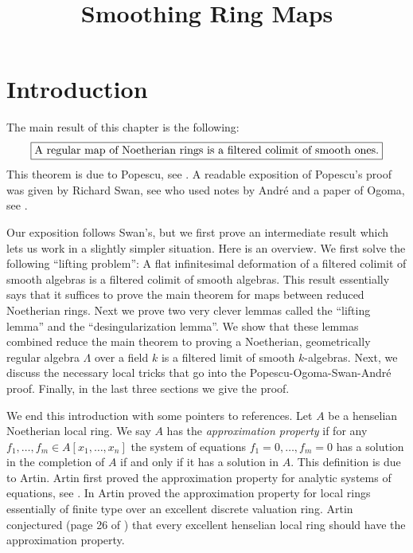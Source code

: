 

%


\title{Smoothing Ring Maps}


\maketitle

\label{section-phantom}

\tableofcontents

\section{Introduction}
\label{section-introduction}

\noindent
The main result of this chapter is the following:
$$
\fbox{A regular map of Noetherian rings is a filtered colimit
of smooth ones.}
$$
This theorem is due to Popescu, see \cite{popescu-letter}.
A readable exposition of Popescu's proof was given by Richard Swan,
see \cite{swan} who used notes by Andr\'e and a paper of Ogoma, see
\cite{Ogoma}.

\medskip\noindent
Our exposition follows Swan's, but we first prove an intermediate result
which lets us work in a slightly simpler situation. Here is an overview.
We first solve the following ``lifting problem'': A flat infinitesimal
deformation of a filtered colimit of smooth algebras is a filtered colimit
of smooth algebras. This result essentially says that it suffices to prove
the main theorem for maps between reduced Noetherian rings. Next we prove
two very clever lemmas called the ``lifting lemma'' and the
``desingularization lemma''. We show that these lemmas combined
reduce the main theorem to proving a Noetherian, geometrically regular
algebra $\Lambda$ over a field $k$ is a filtered limit of smooth $k$-algebras.
Next, we discuss the necessary local tricks that go into the
Popescu-Ogoma-Swan-Andr\'e proof. Finally, in the last three sections
we give the proof.

\medskip\noindent
We end this introduction with some pointers to references.
Let $A$ be a henselian Noetherian local ring.
We say $A$ has the {\it approximation property} if for any
$f_1, \ldots, f_m \in A[x_1, \ldots, x_n]$ the system of equations
$f_1 = 0, \ldots, f_m = 0$ has a solution in the completion
of $A$ if and only if it has a solution in $A$. This definition
is due to Artin.
Artin first proved the approximation property for analytic systems of
equations, see \cite{Artin-Analytic-Approximation}.
In \cite{Artin-Algebraic-Approximation} Artin proved the
approximation property for local rings
essentially of finite type over an excellent discrete valuation ring.
Artin conjectured (page 26 of \cite{Artin-Algebraic-Approximation})
that every excellent henselian local ring should have the
approximation property.

